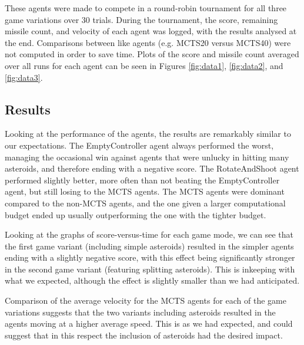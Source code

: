 These agents were made to compete in a round-robin tournament for all three game variations over 30 trials. During the tournament, the score, remaining missile count, and velocity of each agent was logged, with the results analysed at the end. Comparisons between like agents (e.g. MCTS20 versus MCTS40) were not computed in order to save time. Plots of the score and missile count averaged over all runs for each agent can be seen in Figures \ref{fig:data1}, \ref{fig:data2}, and \ref{fig:data3}.

\subsection{Results}

Looking at the performance of the agents, the results are remarkably similar to our expectations. The EmptyController agent always performed the worst, managing the occasional win against agents that were unlucky in hitting many asteroids, and therefore ending with a negative score. The RotateAndShoot agent performed slightly better, more often than not beating the EmptyController agent, but still losing to the MCTS agents. The MCTS agents were dominant compared to the non-MCTS agents, and the one given a larger computational budget ended up usually outperforming the one with the tighter budget.

Looking at the graphs of score-versus-time for each game mode, we can see that the first game variant (including simple asteroids) resulted in the simpler agents ending with a slightly negative score, with this effect being significantly stronger in the second game variant (featuring splitting asteroids). This is inkeeping with what we expected, although the effect is slightly smaller than we had anticipated.

Comparison of the average velocity for the MCTS agents for each of the game variations suggests that the two variants including asteroids resulted in the agents moving at a higher average speed. This is as we had expected, and could suggest that in this respect the inclusion of asteroids had the desired impact.

